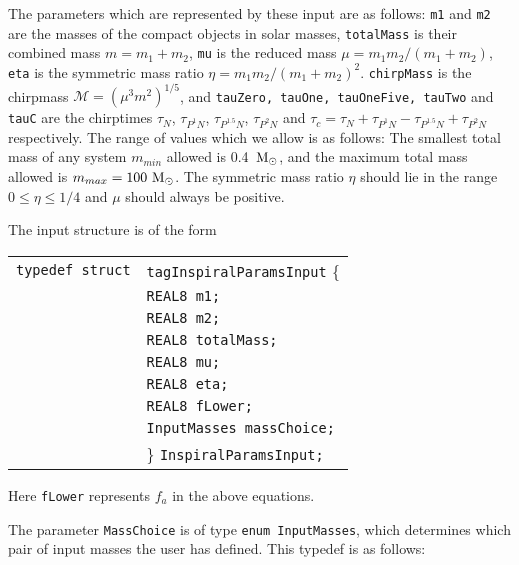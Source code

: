 \documentclass[12pt]{article}
\begin{document}
\vspace{5mm}

The parameters which are represented by these input are as follows: \texttt{m1} and \texttt{m2} are the masses of the compact objects in solar masses, \texttt{totalMass} is their combined mass $m=m_{1}+m_{2}$, \texttt{mu} is the reduced mass $\mu=m_{1}m_{2}/(m_{1}+m_{2})$, \texttt{eta} is the symmetric mass ratio $\eta=m_{1}m_{2}/(m_{1}+m_{2})^{2}$. \texttt{chirpMass} is the chirpmass $\mathcal{M}=(\mu^{3} m^{2})^{1/5}$, and \texttt{tauZero, tauOne, tauOneFive, tauTwo}  and \texttt{tauC} are the chirptimes $\tau_{N}$, $\tau_{P^{1}N}$, $\tau_{P^{1.5}N}$, $\tau_{P^{2}N}$ and $\tau_{c} = \tau_{N} + \tau_{P^{1}N} - \tau_{P^{1.5}N} + \tau_{P^{2}N}$ respectively.
The range of values which we allow is as follows: The smallest total mass of any system $m_{min}$ allowed is 0.4~$\rm{M_{\odot}}$, and the maximum total mass allowed is $m_{max}=100~\rm{M_{\odot}}$. The symmetric mass ratio $\eta$ should lie in the range $0 \leq \eta \leq 1/4$ and $\mu$ should always be positive. 

The input structure is of the form

\vspace{5mm}

\begin{tabular}{ll}
\texttt{typedef struct} & \texttt{tagInspiralParamsInput} \{ \\
                        & \texttt{REAL8 m1;} \\
                        & \texttt{REAL8 m2;}  \\
                        & \texttt{REAL8 totalMass;} \\
                        & \texttt{REAL8 mu;}  \\
                        & \texttt{REAL8 eta;}  \\
                        & \texttt{REAL8 fLower;}  \\
                        & \texttt{InputMasses massChoice;}  \\
                        & \} \texttt{InspiralParamsInput;}
\end{tabular}

\vspace{5mm}

Here \texttt{fLower} represents $f_{a}$ in the above equations.

The parameter \texttt{MassChoice} is of type \texttt{enum InputMasses}, which determines which pair of input masses the user has defined. This typedef is as follows:
\end{document}
